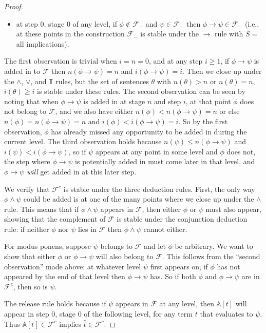 \documentclass[10pt,a4paper]{amsart}
\begin{document}
\begin{proof}
\begin{itemize}
  \item at step 0, stage 0 of any level, if $\phi \not\in \mathcal{F}_-$ and $\psi \in \mathcal{F}_-$ then
    $\phi \to \psi \in \mathcal{F}_-$ (i.e., at these points in the construction $\mathcal{F}_-$ is stable under
    the $\to$ rule with $S =$ all implications).
  \end{itemize}
  The first observation is trivial when $i = n = 0$, and at any step $i \geq 1$, if $\phi \to \psi$ is added in
  to $\mathcal{F}$ then $n(\phi \to \psi) = n$ and $i(\phi \to \psi) = i$. Then we close up under the $\wedge$, $\vee$, and
  $\mathbb{T}$ rules, but the set of sentences $\theta$ with $n(\theta) > n$ or $n(\theta) = n$, $i(\theta) \geq i$ is
  stable under these rules. The second observation can be seen by noting that when $\phi \to \psi$ is added in at
  stage $n$ and step $i$, at that point $\phi$ does not belong to $\mathcal{F}$, and we also have either
  $n(\phi) < n(\phi \to \psi) = n$ or else $n(\phi) = n(\phi \to \psi) = n$ and $i(\phi) < i(\phi \to \psi) = i$.
  So by the first observation, $\phi$ has already missed any opportunity to be
  added in during the current level. The third observation holds because $n(\psi) \leq n(\phi \to \psi)$
  and $i(\psi) < i(\phi \to \psi)$, so if $\psi$ appears at any point in some level and $\phi$ does not,
  the step where $\phi \to \psi$ is
  potentially added in must come later in that level, and $\phi \to \psi$ {\it will} get added in at this later step.

  We verify that $\mathcal{F}^c$ is stable under the three deduction rules. First, the only way $\phi \wedge \psi$
  could be added is at one of the many points where we close up under the $\wedge$ rule. This means that
  if $\phi \wedge \psi$ appears in $\mathcal{F}$, then either $\phi$ or $\psi$ must also appear, showing
  that the complement of $\mathcal{F}$ is stable under the conjunction deduction rule: if neither
  $\phi$ nor $\psi$ lies in $\mathcal{F}$ then $\phi \wedge \psi$ cannot either.

  For modus ponens, suppose $\psi$ belongs to $\mathcal{F}$ and let $\phi$ be arbitrary. We want to show that
  either $\phi$ or $\phi \to \psi$ will also belong to $\mathcal{F}$. This follows from the ``second observation''
  made above: at whatever level $\psi$ first appears on, if $\phi$ has not appeared by the end of that level then
  $\phi \to \psi$ has. So if both $\phi$ and $\phi \to \psi$ are in $\mathcal{F}^c$, then so is $\psi$.

  The release rule holds because if $\psi$ appears in $\mathcal{F}$ at any level, then $\mathbb{A}[t]$ will
  appear in step 0, stage 0 of the following level, for any term $t$ that evaluates to $\psi$. Thus $\mathbb{A}[t] \in
  \mathcal{F}^c$ implies $\hat{t} \in \mathcal{F}^c$.


\end{proof}
\end{document}
